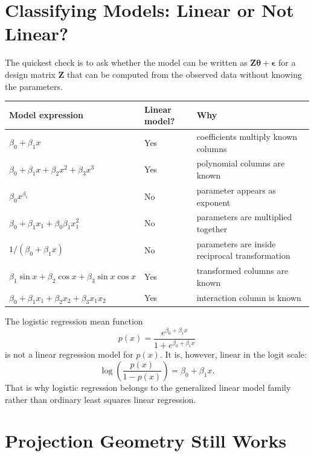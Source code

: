 \section{Classifying Models: Linear or Not Linear?}

The quickest check is to ask whether the model can be written as \(\mathbf{Z}\boldsymbol{\theta}+\boldsymbol{\epsilon}\) for a design matrix \(\mathbf{Z}\) that can be computed from the observed data without knowing the parameters.

\begin{center}
\begin{tabular}{p{}p{}p{}}
\toprule
Model expression & Linear model? & Why \\
\midrule
\(\beta_0+\beta_1x\) & Yes & coefficients multiply known columns \\
\(\beta_0+\beta_1x+\beta_2x^2+\beta_3x^3\) & Yes & polynomial columns are known \\
\(\beta_0x^{\beta_1}\) & No & parameter appears as exponent \\
\(\beta_0+\beta_1x_1+\beta_0\beta_1x_1^2\) & No & parameters are multiplied together \\
\(1/(\beta_0+\beta_1x)\) & No & parameters are inside reciprocal transformation \\
\(\beta_1\sin x+\beta_2\cos x+\beta_3\sin x\cos x\) & Yes & transformed columns are known \\
\(\beta_0+\beta_1x_1+\beta_2x_2+\beta_3x_1x_2\) & Yes & interaction column is known \\
\bottomrule
\end{tabular}
\end{center}

The logistic regression mean function
\begin{equation}
  p(x)=\frac{e^{\beta_0+\beta_1x}}{1+e^{\beta_0+\beta_1x}}
\end{equation}
is not a linear regression model for \(p(x)\).  It is, however, linear in the logit scale:
\begin{equation}
  \log\left(\frac{p(x)}{1-p(x)}\right)=\beta_0+\beta_1x.
\end{equation}
That is why logistic regression belongs to the generalized linear model family rather than ordinary least squares linear regression.

\section{Projection Geometry Still Works}

